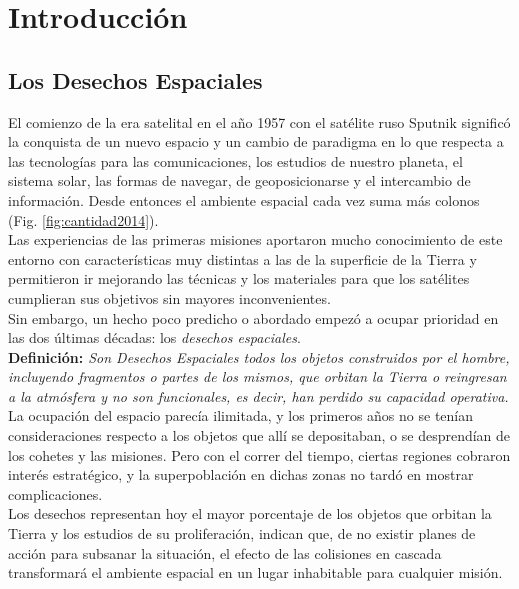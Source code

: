 \chapter{Introducción}
\label{chap:introduccion}


\section{Los Desechos Espaciales}

El comienzo de la era satelital en el a\~no 1957 con el sat\'elite ruso Sputnik signific\'o la conquista de un nuevo espacio y un cambio de paradigma en lo que respecta a las tecnolog\'ias para las comunicaciones, los estudios de nuestro planeta, el sistema solar, las formas de navegar, de geoposicionarse y el intercambio de informaci\'on. Desde entonces el ambiente espacial cada vez suma m\'as colonos (Fig. \ref{fig:cantidad2014}).\\

Las experiencias de las primeras misiones aportaron mucho conocimiento de este entorno con caracter\'isticas muy distintas a las de la superficie de la Tierra y permitieron ir mejorando las t\'ecnicas y los materiales para que los sat\'elites cumplieran sus objetivos sin mayores inconvenientes.\\
Sin embargo, un hecho poco predicho o abordado empez\'o a ocupar prioridad en las dos \'ultimas d\'ecadas: los {\it{desechos espaciales}}.\\

{\bf{Definici\'on:}}{\it{ Son Desechos Espaciales todos los objetos construidos por el hombre, incluyendo fragmentos o partes de los mismos, que orbitan la Tierra o reingresan a la atm\'osfera y no son funcionales, es decir, han perdido su capacidad operativa.}} \citep{iadcguide}\\

La ocupaci\'on del espacio parec\'ia ilimitada, y los primeros a\~nos no se ten\'ian consideraciones respecto a los objetos que all\'i se depositaban, o se desprend\'ian de los cohetes y las misiones. Pero con el correr del tiempo, ciertas regiones cobraron inter\' es estrat\'egico, y la superpoblaci\'on en dichas zonas no tard\'o en mostrar complicaciones.\\

Los desechos representan hoy el mayor porcentaje de los objetos que orbitan la Tierra y los estudios de su proliferaci\'on, indican que, de no existir planes de acci\'on para subsanar la situaci\'on, el efecto de las colisiones en cascada transformar\'a el ambiente espacial en un lugar inhabitable para cualquier misi\'on.\\

